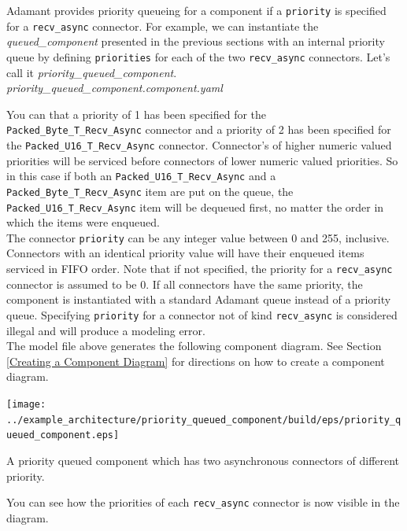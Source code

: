 Adamant provides priority queueing for a component if a \texttt{priority} is specified for a \texttt{recv\_async} connector. For example, we can instantiate the \textit{queued\_component} presented in the previous sections with an internal priority queue by defining \texttt{priorities} for each of the two \texttt{recv\_async} connectors. Let's call it \textit{priority\_queued\_component}. \\

\textit{priority\_queued\_component.component.yaml}

You can that a priority of 1 has been specified for the \texttt{Packed\_Byte\_T\_Recv\_Async} connector and a priority of 2 has been specified for the \texttt{Packed\_U16\_T\_Recv\_Async} connector. Connector's of higher numeric valued priorities will be serviced before connectors of lower numeric valued priorities. So in this case if both an \texttt{Packed\_U16\_T\_Recv\_Async} and a \texttt{Packed\_Byte\_T\_Recv\_Async} item are put on the queue, the \texttt{Packed\_U16\_T\_Recv\_Async} item will be dequeued first, no matter the order in which the items were enqueued. \\

The connector \texttt{priority} can be any integer value between 0 and 255, inclusive. Connectors with an identical priority value will have their enqueued items serviced in FIFO order. Note that if not specified, the priority for a \texttt{recv\_async} connector is assumed to be 0. If all connectors have the same priority, the component is instantiated with a standard Adamant queue instead of a priority queue. Specifying \texttt{priority} for a connector not of kind \texttt{recv\_async} is considered illegal and will produce a modeling error. \\

The model file above generates the following component diagram. See Section \ref{Creating a Component Diagram} for directions on how to create a component diagram.

\vspace{5mm} %
\texttt{[image: ../example\_architecture/priority\_queued\_component/build/eps/priority\_queued\_component.eps]}
\caption{A priority queued component which has two asynchronous connectors of different priority.}
\vspace{5mm} %

You can see how the priorities of each \texttt{recv\_async} connector is now visible in the diagram. \\

